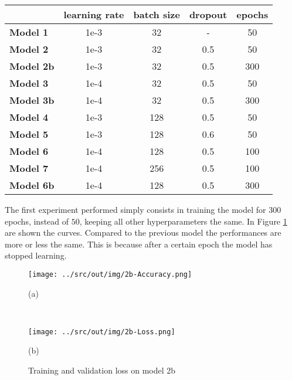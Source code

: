 \documentclass[a4paper,12pt]{article} %
\begin{document}
	\begin{table}[H]
		\centering
		\begin{tabular}{l@{\hspace{.5cm}}cccc}
			\toprule
			& \textbf{learning rate} & \textbf{batch size} & \textbf{dropout} & 
			\textbf{epochs} \\
			\midrule
			\textbf{Model 1}  & {1e-3} & {32}  &  -  & 50\\
			\textbf{Model 2}  & {1e-3} & {32}  & 0.5 & 50\\
			\textbf{Model 2b} & {1e-3} & {32}  & 0.5 & 300\\
			\textbf{Model 3}  & {1e-4} & {32}  & 0.5 & 50 \\
			\textbf{Model 3b} & {1e-4} & {32}  & 0.5 & 300 \\
			\textbf{Model 4}  & {1e-3} & {128} & 0.5 & 50 \\
			\textbf{Model 5}  & {1e-3} & {128} & 0.6 & 50 \\
			\textbf{Model 6}  & {1e-4} & {128} & 0.5 & 100 \\
			\textbf{Model 7}  & {1e-4} & {256} & 0.5 & 100 \\
			\textbf{Model 6b} & {1e-4} & {128} & 0.5 & 300 \\
			\bottomrule 
		\end{tabular}
		\label{tab:param}
	\end{table}

	The first experiment performed simply consists in training the model for 
	$300$ epochs, instead of $50$, keeping all other hyperparameters the same.
	In Figure \ref{fig:model2b-performance} are shown the curves. Compared to 
	the previous model the performances are more or less the same. 
	This is because after a certain epoch the model has stopped learning.
	
	\begin{figure}[H]
		\begin{minipage}[c]{.49\textwidth}
			\centering
			\texttt{[image: ../src/out/img/2b-Accuracy.png]}
			\caption*{(a)}
		\end{minipage}
		~
		\begin{minipage}[c]{.49\textwidth}
			\centering
			\texttt{[image: ../src/out/img/2b-Loss.png]}
			\caption*{(b)}
		\end{minipage}
		\caption{Training and validation loss on model 2b}
		\label{fig:model2b-performance}
	\end{figure}
	
\end{document}

